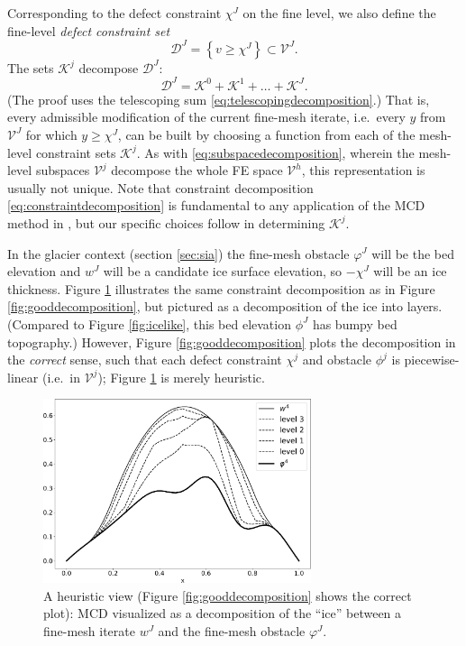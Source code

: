 \documentclass[letterpaper,final,12pt,reqno]{amsart}
\theoremstyle{claim}
\numberwithin{equation}{section}
\numberwithin{figure}{section}
\numberwithin{table}{section}
\numberwithin{theorem}{section}
\begin{document}
Corresponding to the defect constraint $\chi^J$ on the fine level, we also define the fine-level \emph{defect constraint set}
\begin{equation}
  \mathcal{D}^J = \left\{v \ge \chi^J\right\} \subset \mathcal{V}^J.
\end{equation}
The sets $\mathcal{K}^j$ decompose $\mathcal{D}^J$:
\begin{equation}
  \mathcal{D}^J = \mathcal{K}^0 + \mathcal{K}^1 + \dots + \mathcal{K}^J. \label{eq:constraintdecomposition}
\end{equation}
(The proof uses the telescoping sum \eqref{eq:telescopingdecomposition}.)  That is, every admissible modification of the current fine-mesh iterate, i.e.~every $y$ from $\mathcal{V}^J$ for which $y\ge \chi^J$, can be built by choosing a function from each of the mesh-level constraint sets $\mathcal{K}^j$.  As with \eqref{eq:subspacedecomposition}, wherein the mesh-level subspaces $\mathcal{V}^j$ decompose the whole FE space $\mathcal{V}^h$, this representation is usually not unique.  Note that constraint decomposition \eqref{eq:constraintdecomposition} is fundamental to any application of the MCD method in \cite{Tai2003}, but our specific choices follow \cite{GraeserKornhuber2009} in determining $\mathcal{K}^j$.

In the glacier context (section \ref{sec:sia}) the fine-mesh obstacle $\varphi^J$ will be the bed elevation and $w^J$ will be a candidate ice surface elevation, so $-\chi^J$ will be an ice thickness.  Figure \ref{fig:icelikedecomposition} illustrates the same constraint decomposition as in Figure \ref{fig:gooddecomposition}, but pictured as a decomposition of the ice into layers.  (Compared to Figure \ref{fig:icelike}, this bed elevation $\phi^J$ has bumpy bed topography.)  However, Figure \ref{fig:gooddecomposition} plots the decomposition in the \emph{correct} sense, such that each defect constraint $\chi^j$ and obstacle $\phi^j$ is piecewise-linear (i.e.~in $\mathcal{V}^j$); Figure \ref{fig:icelikedecomposition} is merely heuristic.

\begin{figure}
\includegraphics[width=0.7\textwidth]{fixfigs/icedec_defect.pdf}
\caption{A heuristic view (Figure \ref{fig:gooddecomposition} shows the correct plot): MCD visualized as a decomposition of the ``ice'' between a fine-mesh iterate $w^J$ and the fine-mesh obstacle $\varphi^J$.}
\label{fig:icelikedecomposition}
\end{figure}
\end{document}
